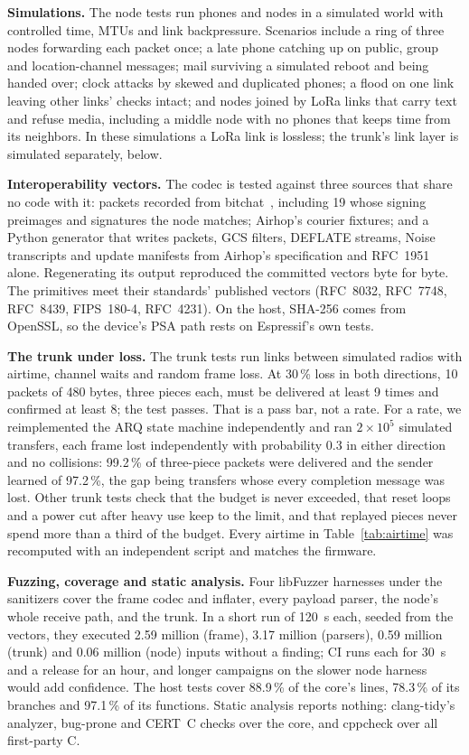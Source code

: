 \documentclass[conference]{IEEEtran}
\begin{document}
\textbf{Simulations.} The node tests run phones and nodes in a simulated world with controlled time, MTUs and link backpressure. Scenarios include a ring of three nodes forwarding each packet once; a late phone catching up on public, group and location-channel messages; mail surviving a simulated reboot and being handed over; clock attacks by skewed and duplicated phones; a flood on one link leaving other links' checks intact; and nodes joined by LoRa links that carry text and refuse media, including a middle node with no phones that keeps time from its neighbors. In these simulations a LoRa link is lossless; the trunk's link layer is simulated separately, below.

\textbf{Interoperability vectors.} The codec is tested against three sources that share no code with it: packets recorded from bitchat~\cite{bitchat}, including 19 whose signing preimages and signatures the node matches; Airhop's courier fixtures; and a Python generator that writes packets, GCS filters, DEFLATE streams, Noise transcripts and update manifests from Airhop's specification and RFC~1951 alone. Regenerating its output reproduced the committed vectors byte for byte. The primitives meet their standards' published vectors (RFC~8032, RFC~7748, RFC~8439, FIPS~180-4, RFC~4231). On the host, SHA-256 comes from OpenSSL, so the device's PSA path rests on Espressif's own tests.

\textbf{The trunk under loss.} The trunk tests run links between simulated radios with airtime, channel waits and random frame loss. At 30\,\% loss in both directions, 10 packets of 480 bytes, three pieces each, must be delivered at least 9 times and confirmed at least 8; the test passes. That is a pass bar, not a rate. For a rate, we reimplemented the ARQ state machine independently and ran $2\times10^5$ simulated transfers, each frame lost independently with probability 0.3 in either direction and no collisions: 99.2\,\% of three-piece packets were delivered and the sender learned of 97.2\,\%, the gap being transfers whose every completion message was lost. Other trunk tests check that the budget is never exceeded, that reset loops and a power cut after heavy use keep to the limit, and that replayed pieces never spend more than a third of the budget. Every airtime in Table~\ref{tab:airtime} was recomputed with an independent script and matches the firmware.

\textbf{Fuzzing, coverage and static analysis.} Four libFuzzer harnesses under the sanitizers cover the frame codec and inflater, every payload parser, the node's whole receive path, and the trunk. In a short run of 120~s each, seeded from the vectors, they executed 2.59 million (frame), 3.17 million (parsers), 0.59 million (trunk) and 0.06 million (node) inputs without a finding; CI runs each for 30~s and a release for an hour, and longer campaigns on the slower node harness would add confidence. The host tests cover 88.9\,\% of the core's lines, 78.3\,\% of its branches and 97.1\,\% of its functions. Static analysis reports nothing: clang-tidy's analyzer, bug-prone and CERT~C checks over the core, and cppcheck over all first-party C.
\end{document}
